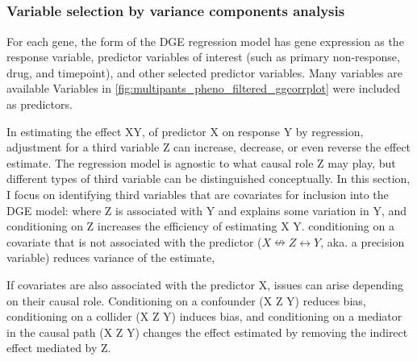 \begin{outline}
\subsection{}

\subsubsection{Variable selection by variance components analysis}
\label{subsubsec:multiPANTS_var_selection}

For each gene, the form of the \gls{DGE} regression model has gene expression as the response variable, 
predictor variables of interest (such as primary non-response, drug, and timepoint),
and other selected predictor variables.
Many variables are available 
Variables in \autoref{fig:multipants_pheno_filtered_ggcorrplot} were included as predictors.

\1 In estimating the effect X\textrightarrow Y, of predictor X on response Y by regression, 
adjustment for a third variable Z can increase, decrease, or even reverse the effect estimate.
The regression model is agnostic to what causal role Z may play,
but different types of third variable can be distinguished conceptually.
In this section, I focus on identifying third variables that are covariates for inclusion into the \gls{DGE} model:
where Z is associated with Y and explains some variation in Y,
and conditioning on Z increases the efficiency of estimating X \textrightarrow Y.
conditioning on a covariate that is not associated with the predictor ($X \nleftrightarrow Z \leftrightarrow Y$, aka. a precision variable) reduces variance of the estimate,

\1 If covariates are also associated with the predictor X, issues can arise depending on their causal role.
Conditioning on a confounder (X \textleftarrow Z \textrightarrow Y) reduces bias,
conditioning on a collider (X \textrightarrow Z \textleftarrow Y) induces bias,
and conditioning on a mediator in the causal path (X \textrightarrow Z \textrightarrow Y) changes the effect estimated by removing the indirect effect mediated by Z.


\end{outline}
